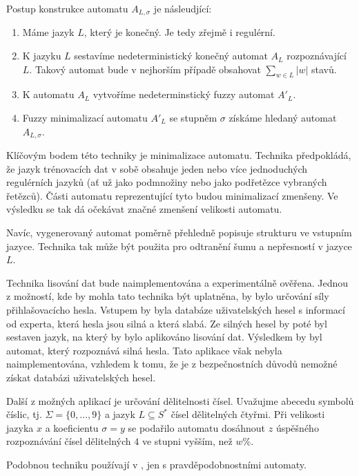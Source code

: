 \documentclass[a4paper,10pt]{article}
\begin{document}
Postup konstrukce automatu $A_{L,\sigma}$ je násleudjící:
\begin{enumerate}
 \item Máme jazyk $L$, který je konečný. Je tedy zřejmě i regulérní.
 \item K jazyku $L$ sestavíme nedeterministický konečný automat $A_{L}$ rozpoznávající $L$. Takový automat bude v nejhorším případě obsahovat $\sum_{w \in L} |w|$ stavů.
 \item K automatu $A_{L}$ vytvoříme nedeterminstický fuzzy automat $A'_{L}$.
 \item Fuzzy minimalizací automatu $A'_{L}$ se stupněm $\sigma$ získáme hledaný automat $A_{L,\sigma}$.
\end{enumerate}

Klíčovým bodem této techniky je minimalizace automatu. Technika předpokládá, že jazyk trénovacích dat v sobě obsahuje jeden nebo více jednoduchých regulérních jazyků (ať už jako podmnožiny nebo jako podřetězce vybraných řetězců). Části automatu reprezentující tyto  budou minimalizací zmenšeny. Ve výsledku se tak dá očekávat značné zmenšení velikosti automatu.

Navíc, vygenerovaný automat poměrně přehledně popisuje strukturu ve vstupním jazyce. Technika tak může být použita pro odtranění šumu a nepřesností v jazyce $L$.

Technika lisování dat bude naimplementována a experimentálně ověřena.  Jednou z možností, kde by mohla tato technika být uplatněna, by bylo určování síly přihlašovacícho hesla. Vstupem by byla databáze uživatelských hesel s informací od experta, která hesla jsou silná a která slabá. Ze silných hesel by poté byl sestaven jazyk, na který by bylo aplikováno lisování dat. Výsledkem by byl automat, který rozpoznává silná hesla. Tato aplikace však nebyla naimplementována, vzhledem k tomu, že je z bezpečnostních důvodů nemožné získat databázi uživatelských hesel.

Další z možných aplikací je určování dělitelnosti čísel. Uvažujme abecedu symbolů číslic, tj. $\Sigma = \{ 0, \dots, 9 \}$ a jazyk $L \subseteq S^*$ čísel dělitelných čtyřmi. Při velikosti jazyka $x$ a koeficientu $\sigma = y$ se podařilo automatu dosáhnout $z$ úspěšného rozpoznávání čísel dělitelných $4$ ve stupni vyšším, než $w\%$. 

Podobnou techniku používají v \cite{Hac+-ProAnaLarFinStaMac}, jen s pravděpodobnostními automaty.


\end{document}
